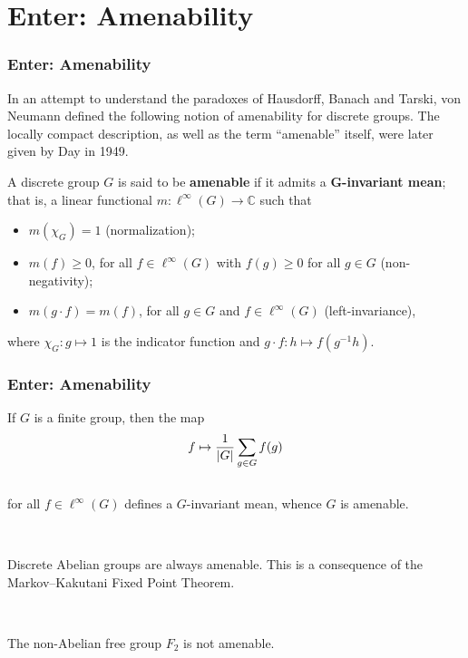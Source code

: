\documentclass{beamer}
\DeclarePairedDelimiter{\abs}{\lvert}{\rvert}
\begin{document}
\section{Enter: Amenability}

\begin{frame}
\frametitle{Enter: Amenability}
In an attempt to understand the paradoxes of Hausdorff, Banach and Tarski, von Neumann defined the following notion of amenability for discrete groups. The locally compact description, as well as the term ``amenable'' itself, were later given by Day in 1949.\\[0.5\baselineskip]%

\begin{definition}[Amenability]
A discrete group $G$ is said to be \textbf{amenable} if it admits a \textbf{$\boldsymbol{G}$-invariant mean}; that is, a linear functional $m : \ell^\infty(G) \to \mathbb{C}$ such that
\begin{itemize}
\item $m(\chi_G) = 1$ (normalization);
\item $m(f) \geq 0$, for all $f \in \ell^\infty(G)$ with $f(g) \geq 0$ for all $g \in G$ (non-negativity);
\item $m(g \cdot f) = m(f)$, for all $g \in G$ and $f \in \ell^\infty(G)$ (left-invariance),
\end{itemize}
where $\chi_G : g \mapsto 1$ is the indicator function and $g \cdot f : h \mapsto f(g^{-1}h)$.
\end{definition}
\end{frame}

\begin{frame}
\frametitle{Enter: Amenability}
\begin{example}
If $G$ is a finite group, then the map\\[-1.5\baselineskip]
\begin{align*}
\begin{split}
f \mapsto \frac{1}{\abs{G}}\sum_{g \in G} f(g)
\end{split}
\end{align*}
\noindent\\[-0.5\baselineskip] for all $f \in \ell^\infty(G)$ defines a $G$-invariant mean, whence $G$ is amenable.
\end{example}
\noindent\\[0.5\baselineskip]
\begin{example}
Discrete Abelian groups are always amenable. This is a consequence of the Markov--Kakutani Fixed Point Theorem.
\end{example}
\noindent\\[0.5\baselineskip]
\begin{example}
The non-Abelian free group $F_2$ is not amenable.
\end{example}
\end{frame}
\end{document}
